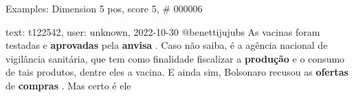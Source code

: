 \begin{frame}{Examples: Dimension 5 pos, score 5, \# 000006}
\footnotesize
\begin{exampleblock}{text: t122542, user: unknown, 2022-10-30}
@benettijujubs As vacinas foram testadas e \textbf{aprovadas} pela 
\textbf{anvisa} . Caso não saiba, é a agência nacional de vigilância sanitária, 
que tem como finalidade fiscalizar a \textbf{produção} e o consumo de tais 
produtos, dentre eles a vacina. E ainda sim, Bolsonaro recusou as 
\textbf{ofertas} de \textbf{compras} . Mas certo é ele 
\end{exampleblock}
\end{frame}
